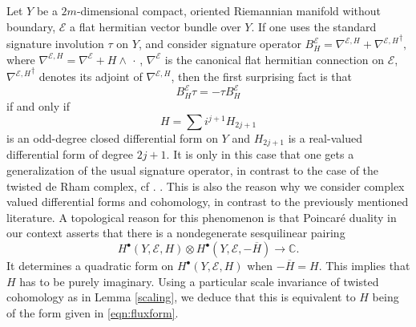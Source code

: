 \documentclass[12pt]{amsart}
\theoremstyle{plain}
\theoremstyle{definition}
\theoremstyle{remark}
\begin{document}
Let $Y$ be a $2m$-dimensional compact, oriented Riemannian manifold without boundary, ${\mathcal E}$
a flat hermitian vector bundle over $Y$. If one uses the standard signature involution 
$\tau$ on $Y$, 
and consider signature operator $B^{\mathcal E}_H=\nabla^{{\mathcal E}, H} + {\nabla^{{\mathcal E}, H}}^\dagger,$ 
where $\nabla^{{\mathcal E}, H}=\nabla^{\mathcal E}+H\wedge\,\cdot\,$, 
$\nabla^{\mathcal E}$ is the canonical flat hermitian connection on ${\mathcal E}$, 
$ {\nabla^{{\mathcal E}, H}}^\dagger$ denotes its adjoint of $ \nabla^{{\mathcal E}, H}$, 
then the first surprising fact is that 
$$
B^{\mathcal E}_H \tau = - \tau B^{\mathcal E}_H
$$
if and only if 
\begin{equation}\label{eqn:fluxform}
H = \sum i^{j+1} H_{2j+1} 
\end{equation}
 is an 
odd-degree closed differential form on $Y$ and $H_{2j+1}$ is a real-valued differential form 
of degree ${2j+1}$. It is only in this case that one gets a {{generalization of the usual}} signature operator, in contrast to the 
case of the twisted de Rham complex, cf . \cite{BCMMS,AS,MW,MW2,MW3}. 
This is also the reason why we consider complex valued differential forms and  cohomology, 
in contrast to the previously mentioned literature. A topological reason for this phenomenon
is that Poincar\'e duality in our context asserts that there is a nondegenerate sesquilinear pairing
$$
H^{\bullet}(Y, {\mathcal E}, H) \otimes H^{\bullet}(Y, {\mathcal E}, -\overline H) \to {\mathbb{C}}.
$$
It determines a quadratic form on $H^{\bullet}(Y, {\mathcal E}, H)$ 
when $-\overline H = H$. This implies that $H$ has to be 
purely imaginary. Using a particular scale invariance of twisted cohomology 
as in Lemma \ref{scaling}, we deduce that this is equivalent to 
$H$ being of the form given in \eqref{eqn:fluxform}.
\end{document}
